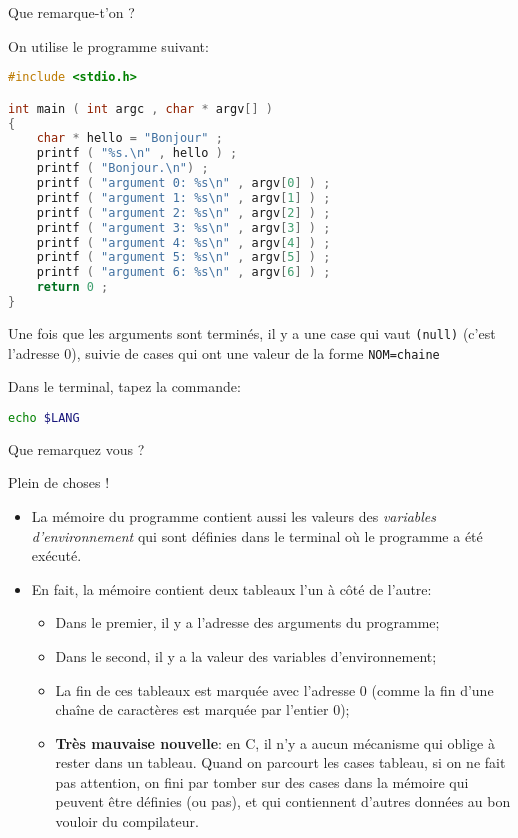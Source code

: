 Que remarque-t'on ?

\begin{solutioncachee}
  On utilise le programme suivant:
  \begin{lstlisting}[language=C]
#include <stdio.h>

int main ( int argc , char * argv[] )
{
    char * hello = "Bonjour" ;
    printf ( "%s.\n" , hello ) ;
    printf ( "Bonjour.\n") ;
    printf ( "argument 0: %s\n" , argv[0] ) ;
    printf ( "argument 1: %s\n" , argv[1] ) ;
    printf ( "argument 2: %s\n" , argv[2] ) ;
    printf ( "argument 3: %s\n" , argv[3] ) ;
    printf ( "argument 4: %s\n" , argv[4] ) ;
    printf ( "argument 5: %s\n" , argv[5] ) ;
    printf ( "argument 6: %s\n" , argv[6] ) ;
    return 0 ;
}
  \end{lstlisting}
  Une fois que les arguments sont terminés, il y a une case qui vaut
  \texttt{(null)} (c'est l'adresse 0), suivie de cases qui ont une
  valeur de la forme \texttt{NOM=chaine}
\end{solutioncachee}

\question Dans le terminal, tapez la commande:
\begin{lstlisting}[language=bash]
  echo $LANG
\end{lstlisting}
Que remarquez vous ?

\begin{solutioncachee}
  Plein de choses !
  \begin{itemize}
  \item La mémoire du programme contient aussi les valeurs des
    \emph{variables d'environnement} qui sont définies dans le
    terminal où le programme a été exécuté.
  \item En fait, la mémoire contient deux tableaux l'un à côté de l'autre:
    \begin{itemize}
    \item Dans le premier, il y a l'adresse des arguments du programme;
    \item Dans le second, il y a la valeur des variables d'environnement;
    \item La fin de ces tableaux est marquée avec l'adresse 0 (comme
      la fin d'une chaîne de caractères est marquée par l'entier 0);
    \item \textbf{Très mauvaise nouvelle}: en C, il n'y a aucun
      mécanisme qui oblige à rester dans un tableau. Quand on parcourt
      les cases tableau, si on ne fait pas attention, on fini par
      tomber sur des cases dans la mémoire qui peuvent être définies
      (ou pas), et qui contiennent d'autres données au bon vouloir du
      compilateur. 
    \end{itemize}
  \end{itemize}

\end{solutioncachee}

